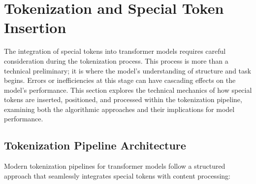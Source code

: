\section{Tokenization and Special Token Insertion}

The integration of special tokens into transformer models requires careful consideration during the tokenization process. This process is more than a technical preliminary; it is where the model's understanding of structure and task begins. Errors or inefficiencies at this stage can have cascading effects on the model's performance. This section explores the technical mechanics of how special tokens are inserted, positioned, and processed within the tokenization pipeline, examining both the algorithmic approaches and their implications for model performance.
\begin{comment}
Feedback: This is a clear introduction. To set the stage even better, you could add a sentence that frames the importance of this step. For example: "This process is more than a technical preliminary; it is where the model's understanding of structure and task begins. Errors or inefficiencies at this stage can have cascading effects on the model's performance."

STATUS: addressed - added explanation of importance emphasizing structural understanding and performance implications
\end{comment}

\subsection{Tokenization Pipeline Architecture}

Modern tokenization pipelines for transformer models follow a structured approach that seamlessly integrates special tokens with content processing:

